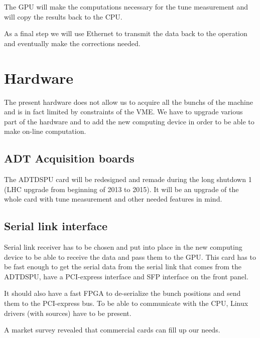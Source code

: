 The \gls{GPU} will make the computations necessary for the \gls{tune} measurement and will copy the results back to the \gls{CPU}.

As a final step we will use Ethernet to transmit the data back to the operation and eventually make the corrections needed.

\section{Hardware}

The present hardware does not allow us to acquire all the \glspl{bunch} of the machine and is in fact limited by constraints of the \gls{VME}. We have to upgrade various part of the hardware and to add the new computing device in order to be able to make on-line computation.

\subsection{ADT Acquisition boards}

The \gls{ADTDSPU} card will be redesigned and remade during the long shutdown 1 (\gls{LHC} upgrade from beginning of 2013 to 2015). It will be an upgrade of the whole card with \gls{tune} measurement and other needed features in mind.

\subsection{Serial link interface}

Serial link receiver has to be chosen and put into place in the new computing device to be able to receive the data and pass them to the \gls{GPU}. This card has to be fast enough to get the serial data from the serial link that comes from the ADTDSPU, have a PCI-express interface and \gls{SFP} interface on the front panel. 

It should also have a fast FPGA to de-serialize the bunch positions and send them to the PCI-express bus. To be able to communicate with the CPU, Linux drivers (with sources) have to be present.

A market survey revealed that commercial cards can fill up our needs.


